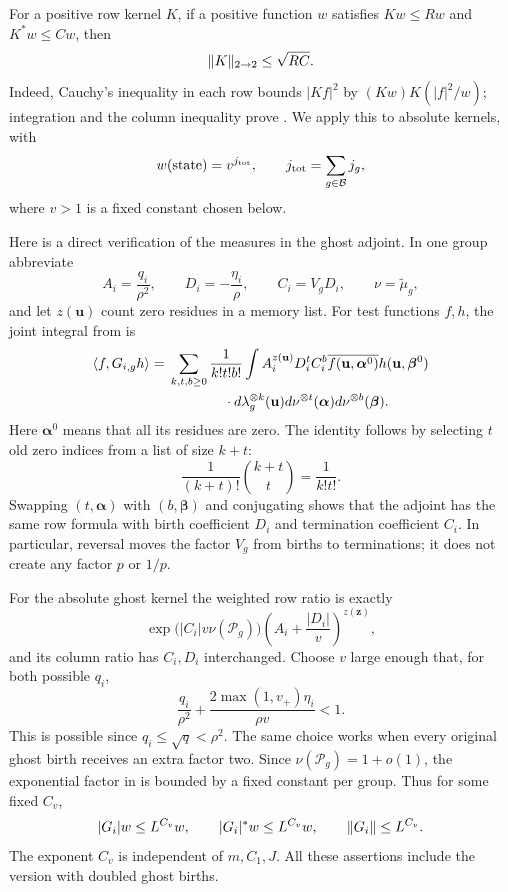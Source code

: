 For a positive row kernel $K$, if a positive function $w$ satisfies
$Kw\le Rw$ and $K^*w\le Cw$, then
\begin{equation}\label{eq:weighted-schur}
 \lVert K\rVert_{2\to2}\le\sqrt{RC}.
\end{equation}
Indeed, Cauchy's inequality in each row bounds $|Kf|^2$ by
$(Kw)K(|f|^2/w)$; integration and the column inequality prove
.  We apply this to absolute kernels,
with
\[
 w(\text{state})=v^{j_{\rm tot}},
 \qquad j_{\rm tot}=\sum_{g\in\mathcal B}j_g,
\]
where $v>1$ is a fixed constant chosen below.

Here is a direct verification of the measures in the ghost
adjoint.  In one group abbreviate
\[
 A_i=\frac{q_i}{\rho^2},\qquad
 D_i=-\frac{\eta_i}{\rho},\qquad C_i=V_gD_i,
 \qquad \nu=\widetilde\mu_g,
\]
and let $z(\mathbf u)$ count zero residues in a memory list.
For test functions $f,h$, the joint integral from
 is
\begin{align}
 \langle f,G_{i,g}h\rangle
 ={}&\sum_{k,t,b\ge0}\frac1{k!t!b!}
 \int A_i^{z(\mathbf u)}D_i^tC_i^b
       \overline{f(\mathbf u,\boldsymbol\alpha^0)}
       h(\mathbf u,\boldsymbol\beta^0)\notag\\
 &\hspace{14mm}\cdot
 d\lambda_g^{\otimes k}(\mathbf u)
 d\nu^{\otimes t}(\boldsymbol\alpha)
 d\nu^{\otimes b}(\boldsymbol\beta).
 \label{eq:ghost-joint-integral}
\end{align}
Here $\boldsymbol\alpha^0$ means that all its residues are zero.
The identity follows by selecting $t$ old zero indices from
a list of size $k+t$:
\[
 \frac1{(k+t)!}\binom{k+t}{t}=\frac1{k!t!}.
\]
Swapping $(t,\boldsymbol\alpha)$ with
$(b,\boldsymbol\beta)$ and conjugating shows that the adjoint
has the same row formula with birth coefficient $D_i$ and
termination coefficient $C_i$.  In particular, reversal moves
the factor $V_g$ from births to terminations; it does not create
any factor $p$ or $1/p$.

For the absolute ghost kernel the weighted row ratio is exactly
\begin{equation}\label{eq:ghost-schur-ratios}
 \exp\bigl(|C_i|v\nu(\mathcal P_g)\bigr)
 \left(A_i+\frac{|D_i|}{v}\right)^{z(\mathbf z)},
\end{equation}
and its column ratio has $C_i,D_i$ interchanged.  Choose $v$
large enough that, for both possible $q_i$,
\begin{equation}\label{eq:memory-weight-choice}
 \frac{q_i}{\rho^2}+
 \frac{2\max(1,v_+)\eta_i}{\rho v}<1.
\end{equation}
This is possible since $q_i\le\sqrt q<\rho^2$.  The same
choice works when every original ghost birth receives an
extra factor two.  Since $\nu(\mathcal P_g)=1+o(1)$, the
exponential factor in  is bounded
by a fixed constant per group.  Thus for some fixed $C_v$,
\begin{equation}\label{eq:ghost-absolute-bound}
 |G_i|w\le L^{C_v}w,\qquad |G_i|^*w\le L^{C_v}w,
 \qquad \lVert G_i\rVert\le L^{C_v}.
\end{equation}
The exponent $C_v$ is independent of $m,C_1,J$.  All these
assertions include the version with doubled ghost births.

